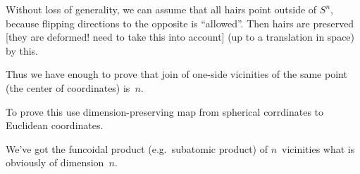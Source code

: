 \documentclass{amsart}
\begin{document}
Without loss of generality, we can assume that all hairs point outside of $S^n$, because flipping directions to the opposite is ``allowed''. Then hairs are preserved [they are deformed! need to take this into account] (up to a translation in space) by this.

Thus we have enough to prove that join of one-si\-de vicinities of the same point (the center of coordinates) is~$n$.

To prove this use di\-men\-si\-on-pre\-ser\-ving map from spherical corrdinates to Euclidean coordinates.

We've got the funcoidal product (e.g.\ subatomic product) of $n$\ vicinities what is obviously of dimension~$n$.



\end{document}
